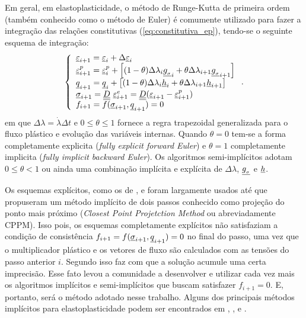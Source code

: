 Em geral, em elastoplasticidade, o método de Runge-Kutta de primeira ordem (também conhecido como o método de Euler) é comumente utilizado para fazer a integração das relações constitutivas (\ref{eq:constitutiva_ep}), tendo-se o seguinte esquema de integração:
\begin{equation}
	\label{eq:esquema_int_constitutiva_ep}
	\left\{
	\begin{array}{lcl}
		\underline{\varepsilon}_{i+1} = \underline{\varepsilon}_i + \Delta \underline{\varepsilon}_i \\
		\underline{\varepsilon}_{i+1}^p = \underline{\varepsilon}_i^p + \left[(1-\theta) \Delta \lambda_i \underline{g_{_\sigma}}_i + \theta \Delta \lambda_{i+1} \underline{g_{_\sigma}}_{i+1}\right] \\
		\underline q_{i+1} = \underline q_i + \left[(1-\theta) \Delta \lambda_i \underline h_i + \theta \Delta \lambda_{i+1} \underline h_{i+1}\right] \\	
		\underline \sigma_{i+1} = \underline{\underline D}~\underline{\varepsilon}_{i+1}^e = \underline{\underline D}( \underline{\varepsilon}_{i+1} - \underline{\varepsilon}_{i+1}^p) \\
		f_{i+1} = f(\underline \sigma_{i+1},\underline q_{i+1}) = 0		
	\end{array}
	\right..
\end{equation}
em que $\Delta \lambda = \dot\lambda\Delta t$ e $0 \leq \theta \leq 1$ fornece a regra trapezoidal generalizada para o fluxo plástico e evolução das variáveis internas. Quando $\theta = 0$ tem-se a forma completamente explicita (\textit{fully explicit forward Euler}) e $\theta = 1$  completamente implicita (\textit{fully implicit backward Euler}). Os algoritmos semi-implícitos adotam $0 \leq \theta < 1$  ou ainda uma combinação implícita e explícita de $\Delta \lambda$, $\underline{g_{_\sigma}}$ e $\underline h$.

Os esquemas explícitos, como os de ,  e  foram largamente usados até que  propuseram um método implícito de dois passos conhecido como projeção do ponto mais próximo (\textit{Closest Point Projetction Method} ou abreviadamente CPPM). Isso pois, os esquemas completamente explícitos não satisfaziam a condição de consistência $f_{i+1} = f(\underline \sigma_{i+1},\underline q_{i+1}) = 0$ no final do passo, uma vez que o multiplicador plástico e os vetores de fluxo são calculados com as tensões do passo anterior $i$. Segundo  isso faz com que a solução acumule uma certa imprecisão. Esse fato levou a comunidade a desenvolver e utilizar cada vez mais os algoritmos implícitos e semi-implícitos que buscam satisfazer $f_{i+1} = 0$. E, portanto, será o método adotado nesse trabalho. Alguns dos principais métodos implícitos para elastoplasticidade podem ser encontrados em , ,  e .

